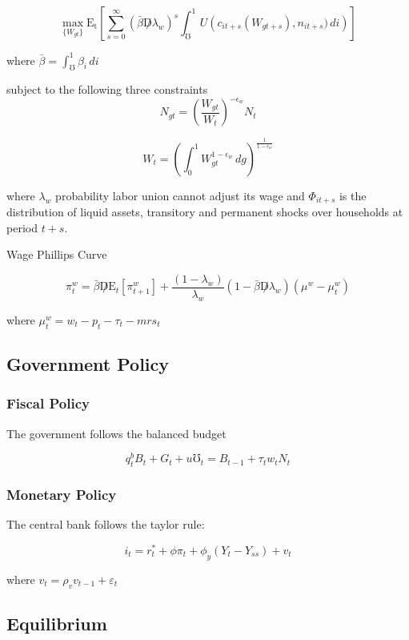 \documentclass[titlepage]{\econtex}\providecommand{\texname}{BufferStockTheory}
\begin{document}
$$ \max_{\{W_{gt}\}} \mathrm{E_{t}}\left[\sum_{s=0}^{\infty} (\bar{\beta} \not D \lambda_{w})^{s} \int_{\mho}^{1}  U\left (c_{it+s}(W_{gt+s}), n_{i t+s}) \, di \right)\right] $$

where $\bar{\beta} = \int_{\mho}^{1} \beta_{i} \, di$

subject to the following three constraints $$ N_{gt} = \left(\frac{W_{gt}}{W_{t}}\right)^{-\epsilon_{w}} N_{t} $$

$$ W_{t} = \left(\int_{0}^{1} W_{gt}^{1-\epsilon_{w}}\,dg\right)^{\frac{1}{1-\epsilon_{w}}}$$

where $\lambda_{w}$ probability labor union cannot adjust its wage and $\Phi_{it+s}$ is the distribution of  liquid assets, transitory and permanent shocks over households at period $t+s$.


Wage Phillips Curve


$$ \pi_{t}^{w} =   \bar{\beta} \not D  \mathrm{E}_{t} \left[ \pi_{t+1}^{w}\right] + \frac{(1-\lambda_{w})}{\lambda_{w}} (1- \bar{\beta} \not D \lambda_{w}) (\mu^{w} - \mu_{t}^{w})$$

where $\mu_{t}^{w} = w_{t} - p_{t} - \tau_{t} - mrs_{t}$


\hypertarget{Government Policy}{}
\subsection{Government Policy}



\hypertarget{Fiscal Policy}{}
\subsubsection{Fiscal Policy}

The government follows the balanced budget

$$ q^{b}_{t} B_{t} + G_{t} + \mathit{u} \mho_{t} =  B_{t-1} +  \tau_{t} w_{t} N_{t} $$ 

\hypertarget{Monetary Policy}{}
\subsubsection{Monetary Policy}


The central bank follows the taylor rule: 

$$i_{t} = r_{t}^{*} +\phi \pi_{t} + \phi_{y} (Y_{t} - Y_{ss}) + v_{t}$$

where $v_{t} = \rho_{v} v_{t-1} +\varepsilon_{t}$


\hypertarget{Equilibrium}{}
\subsection{Equilibrium}
\end{document}

